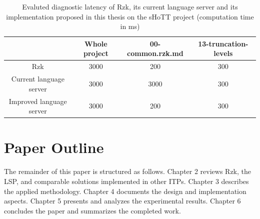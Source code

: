 \begin{table}[b]
	\centering
	\begin{center}
		\begin{tabular}{|c|c|c|c|}
			\hline
			& Whole project & 00-common.rzk.md & 13-truncation-levels \\ \hline
			Rzk & 3000 & 200 & 300 \\ \hline
			Current language server & 3000 & 3000 & 300 \\ \hline
			Improved language server & 3000 & 200 & 300 \\ \hline
		\end{tabular}
	\end{center}
	\caption{Evaluted diagnostic latency of Rzk, its current language server and its implementation proposed in this thesis on the sHoTT project (computation time in ms)}
	\label{tab:perf}
\end{table}

\section{Paper Outline}
\label{intro:outline}

The remainder of this paper is structured as follows.
Chapter 2 reviews Rzk, the LSP, and comparable solutions implemented in other ITPs.
Chapter 3 describes the applied methodology.
Chapter 4 documents the design and implementation aspects.
Chapter 5 presents and analyzes the experimental results.
Chapter 6 concludes the paper and summarizes the completed work.
